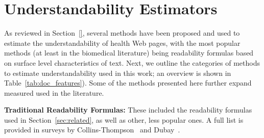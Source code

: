 
\section{ Understandability Estimators}
\label{sec:proxies}

As reviewed in Section~\ref{}, several methods have been proposed and used to estimate the understandability of health Web pages, with the most popular methods (at least in the biomedical literature) being readability formulas based on surface level characteristics of text. Next, we outline the categories of methods to estimate understandability used in this work; an overview is shown in Table~\ref{tab:doc_features}). Some of the methods presented here further expand measured used in the literature. 


 


\textbf{Traditional Readability Formulas:}
These included the readability formulas used in Section~\ref{sec:related}, as well as other, less popular ones. A full list is provided in surveys by Collins-Thompson~\cite{collins2014computational} and Dubay~\cite{dubay04}.



